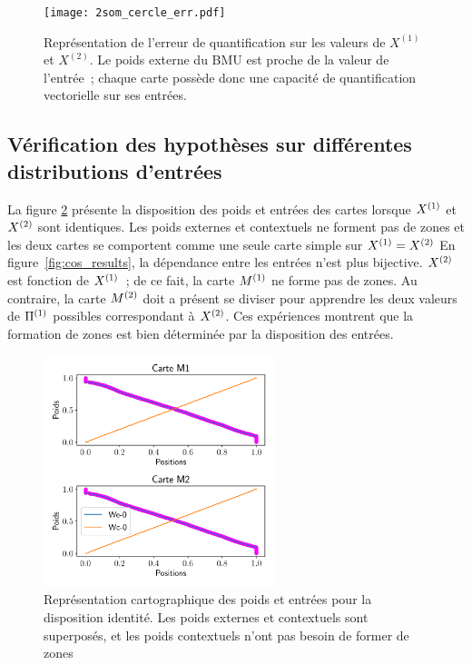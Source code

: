 \documentclass[../main]{subfiles}
\begin{document}
\begin{figure}
	\centering\texttt{[image: 2som\_cercle\_err.pdf]}
	\caption{Représentation de l'erreur de quantification sur les valeurs de $X^{(1)}$ et $X^{(2)}$. Le poids externe du BMU est proche de la valeur de l'entrée~; chaque carte possède donc une capacité de quantification vectorielle sur ses entrées. \label{fig:qv}}
\end{figure}




\subsection{Vérification des hypothèses sur différentes distributions d'entrées}

La figure \ref{fig:id_results} présente la disposition des poids et entrées des cartes lorsque $X^{({1})}$ et $X^{({2})}$ sont identiques. Les poids externes et contextuels ne forment pas de zones et les deux cartes se comportent comme une seule carte simple sur $X^{({1})} = X^{({2})}$
En figure~\ref{fig:cos_results}, la dépendance entre les entrées n'est plus bijective. $X^{({2})}$ est fonction de $X^{({1})}$~; de ce fait, la carte $M^{({1})}$ ne forme pas de zones. Au contraire, la carte $M^{({2})}$ doit a présent se diviser pour apprendre les deux valeurs de $\Pi^{({1})}$ possibles correspondant à $X^{({2})}$. Ces expériences montrent que la formation de zones est bien déterminée par la disposition des entrées.

\begin{figure}
	\centering\includegraphics[width=0.6\textwidth]{2som_id_w.pdf}
	\caption{Représentation cartographique des poids et entrées pour la disposition identité. Les poids externes et contextuels sont superposés, et les poids contextuels n'ont pas besoin de former de zones \label{fig:id_results}}
	\end{figure}
	
\end{document}
